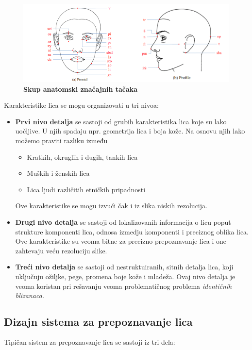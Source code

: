 \documentclass[11pt, a4paper]{article}
\begin{document}
\begin{figure}[h!]
	\centerline{\includegraphics[width=0.8\linewidth]{points.png}}
	\caption{\textbf{Skup anatomski značajnih tačaka}}
	\label{fig:points}
\end{figure}

\newpage

Karakteristike lica se mogu organizovati u tri nivoa:

\begin{itemize}
    \item \textbf{Prvi nivo detalja} se sastoji od grubih karakteristika lica koje su lako uočljive. U njih spadaju npr. geometrija lica i boja kože. Na osnovu njih lako možemo praviti razliku između
    \begin{itemize}
        \item Kratkih, okruglih i dugih, tankih lica
        \item Muških i ženskih lica
        \item Lica ljudi različitih etničkih pripadnosti
    \end{itemize}
    Ove karakteristike se mogu izvući čak i iz slika niskih rezolucija.
    \item \textbf{Drugi nivo detalja} se sastoji od lokalizovanih informacija o licu poput strukture komponenti lica, odnosa izmedju komponenti i preciznog oblika lica. Ove karakteristike su veoma bitne za precizno prepoznavanje lica i one zahtevaju veću rezoluciju slike.
    \item \textbf{Treći nivo detalja} se sastoji od nestruktuiranih, sitnih detalja lica, koji uključuju ožiljke, pege, promena boje kože i mladeža. Ovaj nivo detalja je veoma koristan pri rešavanju veoma problematičnog problema \textit{identičnih blizanaca}.
\end{itemize}

\subsection{Dizajn sistema za prepoznavanje lica}

Tipičan sistem za prepoznavanje lica se sastoji iz tri dela:
\end{document}
